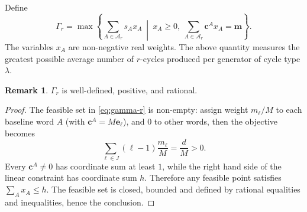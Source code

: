 \documentclass[DIV=12,10pt]{scrartcl}
\theoremstyle{definition}
\newtheorem{remark}{Remark}
\newcommand{\cvec}{\mathbf{c}}
\newcommand{\mvec}{\mathbf{m}}
\newcommand{\evec}{\mathbf{e}}
\newcommand{\dict}{\mathcal{A}}
\begin{document}
Define
\begin{equation}
	\label{eq:gamma-r}
	\Gamma_r = \max\left\{ \sum_{A\in\dict_r} s_A x_A\ \middle|\ x_A\geqslant 0,\ \sum_{A\in\dict_r} \cvec^A x_A = \mvec \right\}.
\end{equation}
The variables $x_A$ are non-negative real weights. The above quantity measures the greatest possible average number of $r$-cycles produced per generator of cycle type $\lambda$.

\begin{remark}
	\label{rmk:gamma-r-positive-rational}
	$\Gamma_r$ is well-defined, positive, and rational.
\end{remark}
\begin{proof}
The feasible set in \cref{eq:gamma-r} is non-empty: assign weight $m_\ell/M$ to each baseline word $A$ (with $\cvec^A = M\evec_\ell$), and $0$ to other words, then the objective becomes
\[
	\sum_{\ell\in J} (\ell-1) \frac{m_\ell}{M} = \frac{d}{M} > 0.
\]
Every $\cvec^A\neq 0$ has coordinate sum at least $1$, while the right hand side of the linear constraint has coordinate sum $h$. Therefore any feasible point satisfies $\sum_A x_A\leqslant h$. The feasible set is closed, bounded and defined by rational equalities and inequalities, hence the conclusion.
\end{proof}
\end{document}
